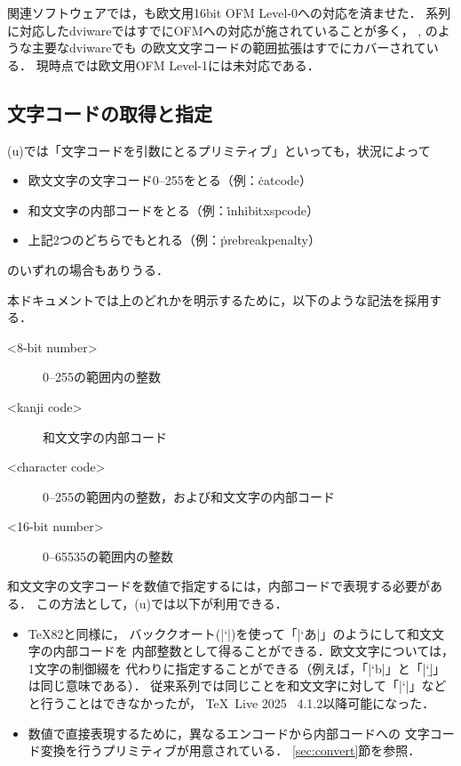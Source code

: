 \documentclass[a4paper,11pt,nomag,dvipdfmx]{jsarticle}
\begin{document}
関連ソフトウェアでは，も欧文用16bit OFM Level-0への対応を済ませた．
\pTeX 系列に対応したdviwareではすでにOFMへの対応が施されていることが多く，
, のような主要なdviwareでも
\upTeX の欧文文字コードの範囲拡張はすでにカバーされている．
現時点で\upTeX は欧文用OFM Level-1には未対応である．


\subsection{文字コードの取得と指定}\label{sec:getcode}
(u)\pTeX では「文字コードを引数にとるプリミティブ」といっても，状況によって
\begin{itemize}
 \item 欧文文字の文字コード0--255をとる（例：\.{catcode}）
 \item 和文文字の内部コードをとる（例：\.{inhibitxspcode}）
 \item 上記2つのどちらでもとれる（例：\.{prebreakpenalty}）
\end{itemize}
のいずれの場合もありうる．

\medskip

本ドキュメントでは上のどれかを明示するために，以下のような記法を採用する．
\begin{description}
 \item[<8-bit number>] 0--255の範囲内の整数
 \item[<kanji code>] 和文文字の内部コード
 \item[<character code>] 0--255の範囲内の整数，および和文文字の内部コード
 \item[<16-bit number>] 0--65535の範囲内の整数
\end{description}

和文文字の文字コードを数値で指定するには，内部コードで表現する必要がある．
この方法として，(u)\pTeX では以下が利用できる．
\begin{itemize}
 \item \TeX82と同様に，
  バッククオート(|`|)を使って「|`あ|」のようにして和文文字の内部コードを
  内部整数として得ることができる．欧文文字については，1文字の制御綴を
  代わりに指定することができる（例えば，「|`b|」と「|`\b|」は同じ意味である）．
  従来\pTeX 系列では同じことを和文文字に対して「|`\あ|」などと行うことはできなかったが，
  \TeX~Live 2025 \pTeX~4.1.2以降可能になった\cite{tjb167}．
 \item 数値で直接表現するために，異なるエンコードから内部コードへの
  文字コード変換を行うプリミティブが用意されている．
  \ref{sec:convert}節を参照．
\end{itemize}
\end{document}
